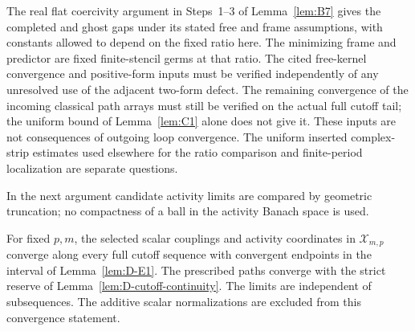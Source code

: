 The real flat coercivity argument in Steps~1--3 of Lemma~\ref{lem:B7} gives the completed and ghost gaps under its stated free and frame assumptions, with constants allowed to depend on the fixed ratio here. The minimizing frame and predictor are fixed finite-stencil germs at that ratio. The cited free-kernel convergence and positive-form inputs must be verified independently of any unresolved use of the adjacent two-form defect. The remaining convergence of the incoming classical path arrays must still be verified on the actual full cutoff tail; the uniform bound of Lemma~\ref{lem:C1} alone does not give it. These inputs are not consequences of outgoing loop convergence. The uniform inserted complex-strip estimates used elsewhere for the ratio comparison and finite-period localization are separate questions.

In the next argument candidate activity limits are compared by geometric truncation; no compactness of a ball in the activity Banach space is used.
\begin{lemma}\label{lem:D-fixed-level}
For fixed $p,m$, the selected scalar couplings and activity coordinates in $\mathcal X_{m,p}$ converge along every full cutoff sequence with convergent endpoints in the interval of Lemma~\ref{lem:D-E1}. The prescribed paths converge with the strict reserve of Lemma~\ref{lem:D-cutoff-continuity}. The limits are independent of subsequences. The additive scalar normalizations are excluded from this convergence statement.
\end{lemma}
